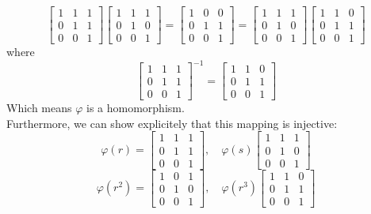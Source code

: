 \documentclass{article}
\begin{document}
    \[ \begin{bmatrix} 1 & 1 & 1 \\
        0 & 1 & 1 \\
        0 & 0 & 1 \end{bmatrix}
    \begin{bmatrix} 1 & 1 & 1 \\
        0 & 1 & 0 \\
        0 & 0 & 1 \end{bmatrix}
    = \begin{bmatrix} 1 & 0 & 0 \\
        0 & 1 & 1 \\
        0 & 0 & 1 \end{bmatrix}
    = \begin{bmatrix} 1 & 1 & 1 \\
        0 & 1 & 0 \\
        0 & 0 & 1 \end{bmatrix}
    \begin{bmatrix} 1 & 1 & 0 \\
        0 & 1 & 1 \\
        0 & 0 & 1 \end{bmatrix} \] 
    where
    \[ \begin{bmatrix} 1 & 1 & 1 \\
        0 & 1 & 1 \\
        0 & 0 & 1 \end{bmatrix}^{-1}
    = \begin{bmatrix} 1 & 1 & 0 \\
        0 & 1 & 1 \\
        0 & 0 & 1 \end{bmatrix} \] 
    Which means $\varphi$ is a homomorphism. \\
    Furthermore, we can show explicitely that this mapping is injective:
    \[ \varphi(r) = \begin{bmatrix} 1 & 1 & 1 \\
        0 & 1 & 1 \\
        0 & 0 & 1 \end{bmatrix}, \quad
    \varphi(s) \begin{bmatrix} 1 & 1 & 1 \\
        0 & 1 & 0 \\
        0 & 0 & 1 \end{bmatrix} \]
    \[ \varphi(r^2) = \begin{bmatrix} 1 & 0 & 1 \\
        0 & 1 & 0 \\
        0 & 0 & 1 \end{bmatrix}, \quad
    \varphi(r^3) \begin{bmatrix} 1 & 1 & 0 \\
        0 & 1 & 1 \\
        0 & 0 & 1 \end{bmatrix} \]
\end{document}
